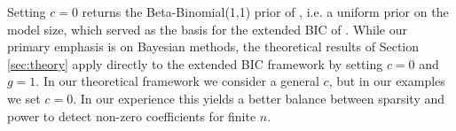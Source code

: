 Setting $c=0$ returns the Beta-Binomial(1,1) prior of \cite{scott:2006}, i.e. a uniform prior on the model size, 
which served as the basis for the extended BIC of \cite{chen:2008}. 
While our primary emphasis is on Bayesian methods, the theoretical results of Section \ref{sec:theory} apply directly to the extended BIC framework by setting $c=0$ and $g=1$.  In our theoretical framework we consider a general $c$, but in our examples we set \(c = 0\). In our experience this yields a better balance between sparsity and power to detect non-zero coefficients for finite $n$.


